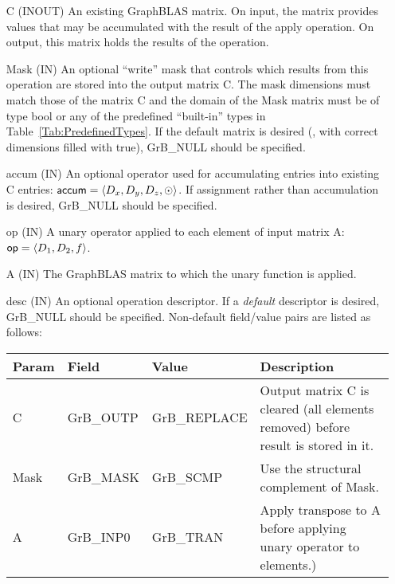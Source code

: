 \begin{itemize}[leftmargin=1in]
    \item[{\sf C}]     ({\sf INOUT}) An existing GraphBLAS matrix.  On input,
    the matrix provides values that may be accumulated with the result of the
    apply operation.  On output, this matrix holds the results of the
    operation.

    \item[{\sf Mask}] ({\sf IN}) An optional ``write'' mask that controls which
    results from this operation are stored into the output matrix {\sf C}. The 
    mask dimensions must match those of the matrix {\sf C} and the domain of the 
    {\sf Mask} matrix must be of type {\sf bool} or any of the predefined 
    ``built-in'' types in Table~\ref{Tab:PredefinedTypes}.  If the default
    matrix is desired (\ie, with correct dimensions filled with {\sf true}), 
    {\sf GrB\_NULL} should be specified.

    \item[{\sf accum}] ({\sf IN})  An optional operator used for accumulating
    entries into existing {\sf C} entries: ${\sf accum} = \langle D_x,
    D_y, D_z,\odot \rangle$. If assignment rather than accumulation is
    desired, {\sf GrB\_NULL} should be specified.

    \item[{\sf op}] ({\sf IN}) A unary operator applied to each
	    element of input matrix {\sf A}: ${\sf op} = \langle D_1, D_2, f \rangle$.

    \item[{\sf A}]     ({\sf IN})  The GraphBLAS matrix to which the unary function 
    is applied.

    \item[{\sf desc}] ({\sf IN}) An optional operation descriptor. If
    a \emph{default} descriptor is desired, {\sf GrB\_NULL} should be
    specified. Non-default field/value pairs are listed as follows:  \\

    \begin{tabular}{lllp{2.5in}}
        Param & Field  & Value & Description \\
        \hline
        {\sf C}    & {\sf GrB\_OUTP} & {\sf GrB\_REPLACE} & Output matrix {\sf C} 
        is cleared (all elements removed) before result is stored in it. \\
    
        {\sf Mask} & {\sf GrB\_MASK} & {\sf GrB\_SCMP}   & Use the structural 
        complement of {\sf Mask}. \\
    
        {\sf A}    & {\sf GrB\_INP0} & {\sf GrB\_TRAN}   & Apply transpose to {\sf A} 
        before applying unary operator to elements.) \\
    \end{tabular}
\end{itemize}

